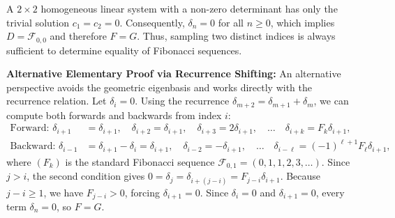 \begin{exercisesolution}
A $2 \times 2$ homogeneous linear system with a non-zero determinant has only the trivial solution $c_1 = c_2 = 0$. Consequently, $\delta_n = 0$ for all $n \ge 0$, which implies $D = \mathcal{F}_{0,0}$ and therefore $F = G$. Thus, sampling two distinct indices is always sufficient to determine equality of Fibonacci sequences.

\begin{ainote}
\textbf{Alternative Elementary Proof via Recurrence Shifting:}
An alternative perspective avoids the geometric eigenbasis and works directly with the recurrence relation. Let $\delta_i = 0$. Using the recurrence $\delta_{m+2} = \delta_{m+1} + \delta_m$, we can compute both forwards and backwards from index $i$:
\begin{align*}
\text{Forward: } \delta_{i+1} &= \delta_{i+1}, \quad \delta_{i+2} = \delta_{i+1}, \quad \delta_{i+3} = 2\delta_{i+1}, \quad \dots \quad \delta_{i+k} = F_k \delta_{i+1}, \\
\text{Backward: } \delta_{i-1} &= \delta_{i+1} - \delta_i = \delta_{i+1}, \quad \delta_{i-2} = -\delta_{i+1}, \quad \dots \quad \delta_{i-\ell} = (-1)^{\ell+1} F_\ell \delta_{i+1},
\end{align*}
where $(F_k)$ is the standard Fibonacci sequence $\mathcal{F}_{0,1} = (0, 1, 1, 2, 3, \dots)$.
Since $j > i$, the second condition gives $0 = \delta_j = \delta_{i+(j-i)} = F_{j-i} \delta_{i+1}$. Because $j - i \ge 1$, we have $F_{j-i} > 0$, forcing $\delta_{i+1} = 0$. Since $\delta_i = 0$ and $\delta_{i+1} = 0$, every term $\delta_n = 0$, so $F = G$.
\end{ainote}
\end{exercisesolution}

